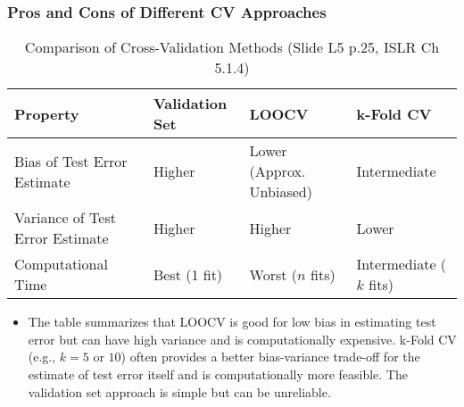 \documentclass[12pt,a4paper]{article}
\begin{document}
\begin{itemize}
    \subsubsection{Pros and Cons of Different CV Approaches }
        \begin{table}[H]
            \centering
            \caption{Comparison of Cross-Validation Methods (Slide L5 p.25, ISLR Ch 5.1.4)}
            \begin{tabular}{@{}llll@{}}
                \toprule
                Property & Validation Set & LOOCV & k-Fold CV \\ \midrule
                Bias of Test Error Estimate & Higher & Lower (Approx. Unbiased) & Intermediate \\
                Variance of Test Error Estimate & Higher & Higher & Lower \\
                Computational Time & Best (1 fit) & Worst ($n$ fits) & Intermediate ($k$ fits) \\ \bottomrule
            \end{tabular}
            \label{tab:cv_comparison}
        \end{table}

        
        \begin{itemize}
            \item The table summarizes that LOOCV is good for low bias in estimating test error but can have high variance and is computationally expensive. k-Fold CV (e.g., $k=5$ or $10$) often provides a better bias-variance trade-off for the estimate of test error itself and is computationally more feasible. The validation set approach is simple but can be unreliable.
        \end{itemize}


\end{itemize}
\end{document}

